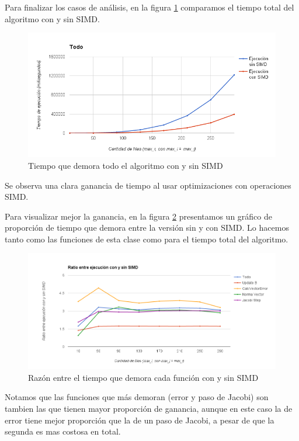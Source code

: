 \documentclass[a4paper]{article}
\begin{document}
Para finalizar los casos de análisis, en la figura \ref{fig:All} comparamos el tiempo total del algoritmo con y sin SIMD.

\begin{figure}[!htbp]
  \centering
	\includegraphics[width=.8\linewidth]{images/All.png}
  \caption{Tiempo que demora todo el algoritmo con y sin SIMD}
  \label{fig:All}
\end{figure}
Se observa una clara ganancia de tiempo al usar optimizaciones con operaciones SIMD.\\
\bigskip

Para visualizar mejor la ganancia, en la figura \ref{fig:RatioSIMD2} 
presentamos un gráfico de proporción de tiempo que demora entre 
la versión sin y con SIMD. Lo hacemos tanto como las funciones de 
esta clase como para el tiempo total del algoritmo.

\begin{figure}[!htbp]
  \centering
	\includegraphics[scale = 0.55]{images/RatioSIMD2.png}
  \caption{Razón entre el tiempo que demora cada función con y sin SIMD}
	\label{fig:RatioSIMD2}
\end{figure}

Notamos que las funciones que más demoran (error y paso de Jacobi) 
son tambien las que tienen mayor proporción de ganancia, aunque en 
este caso la de error tiene mejor proporción que la de un paso de 
Jacobi, a pesar de que la segunda es mas costosa en total.\\
\end{document}
